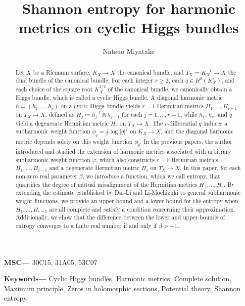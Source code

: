 \documentclass[12pt]{article}
\theoremstyle{definition}
\providecommand{\keywords}[1]
{
\small 
\textbf{{Keywords---}} #1
}
\providecommand{\MSC}[1]
{
\small 
\textbf{{MSC---}} #1
}
\begin{document}
\title {Shannon entropy for harmonic metrics on cyclic Higgs bundles}
\author {Natsuo Miyatake}
\date{}
\maketitle
\begin{abstract} 
Let $X$ be a Riemann surface, $K_X \rightarrow X$ the canonical bundle, and $T_X\coloneqq K_X^{-1}\rightarrow X$ the dual bundle of the canonical bundle. For each integer $r \geq 2$, each $q \in H^0(K_X^r)$, and each choice of the square root $K_X^{1/2}$ of the canonical bundle, we canonically obtain a Higgs bundle, which is called a cyclic Higgs bundle. A diagonal harmonic metric $h = (h_1, \dots, h_r)$ on a cyclic Higgs bundle yields $r-1$-Hermitian metrics $H_1, \dots, H_{r-1}$ on $T_X\rightarrow X$, defined as $H_j \coloneqq h_j^{-1} \otimes h_{j+1}$ for each $j=1,\dots, r-1$, while $h_1$, $h_r$, and $q$ yield a degenerate Hermitian metric $H_r$ on $T_X \rightarrow X$. 
The $r$-differential $q$ induces a subharmonic weight function $\phi_q=\frac{1}{r}\log|q|^2$ on $K_X\rightarrow X$, and the diagonal harmonic metric depends solely on this weight function $\phi_q$. In the previous papers, the author introduced and studied the extension of harmonic metrics associated with arbitrary subharmonic weight function $\varphi$, which also constructs $r-1$-Hermitian metrics $H_1,\dots, H_{r-1}$ and a degenerate Hermitian metric $H_r$ on $T_X\rightarrow X$. In this paper, for each non-zero real parameter $\beta$, we introduce a function, which we call entropy, that quantifies the degree of mutual misalignment of the Hermitian metrics $H_1,\dots, H_r$. 
By extending the estimate established by Dai-Li and Li-Mochizuki to general subharmonic weight functions, we provide an upper bound and a lower bound for the entropy when $H_1,\dots, H_{r-1}$ are all complete and satisfy a condition concerning their approximation. Additionally, we show that the difference between the lower and upper bounds of entropy converges to a finite real number if and only if $\beta>-1$.


\end{abstract}

\MSC{30C15, 31A05, 53C07}

\keywords{Cyclic Higgs bundles, Harmonic metrics, Complete solution, Maximum principle, Zeros in holomorphic sections, Potential theory, Shannon entropy}
\end{document}
